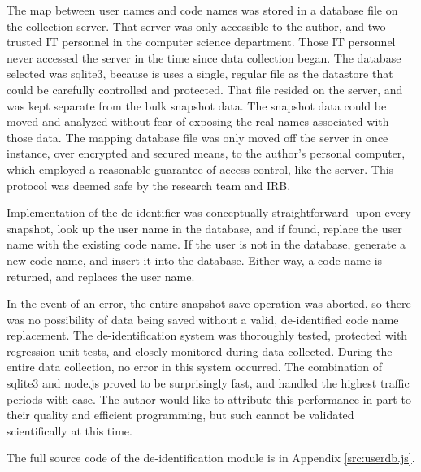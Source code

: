 The map between user names and code names was stored in a database file on the collection server. That server was only accessible to the author, and two trusted IT personnel in the computer science department. Those IT personnel never accessed the server in the time since data collection began. The database selected was sqlite3, because is uses a single, regular file as the datastore that could be carefully controlled and protected. That file resided on the server, and was kept separate from the bulk snapshot data. The snapshot data could be moved and analyzed without fear of exposing the real names associated with those data. The mapping database file was only moved off the server in once instance, over encrypted and secured means, to the author's personal computer, which employed a reasonable guarantee of access control, like the server. This protocol was deemed safe by the research team and IRB.

Implementation of the de-identifier was conceptually straightforward- upon every snapshot, look up the user name in the database, and if found, replace the user name with the existing code name. If the user is not in the database, generate a new code name, and insert it into the database. Either way, a code name is returned, and replaces the user name. 

In the event of an error, the entire snapshot save operation was aborted, so there was no possibility of data being saved without a valid, de-identified code name replacement. The de-identification system was thoroughly tested, protected with regression unit tests, and closely monitored during data collected. During the entire data collection, no error in this system occurred. The combination of sqlite3 and node.js proved to be surprisingly fast, and handled the highest traffic periods with ease. The author would like to attribute this performance in part to their quality and efficient programming, but such cannot be validated scientifically at this time.

The full source code of the de-identification module is in Appendix \ref{src:userdb.js}.

